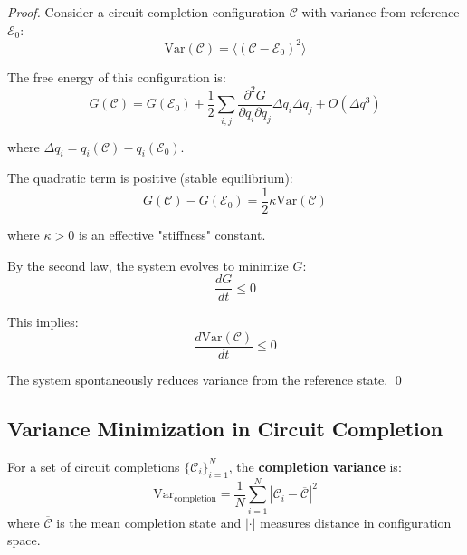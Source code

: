 \begin{proof}
Consider a circuit completion configuration $\mathcal{C}$ with variance from reference $\mathcal{E}_0$:
\begin{equation}
\text{Var}(\mathcal{C}) = \langle (\mathcal{C} - \mathcal{E}_0)^2 \rangle
\end{equation}

The free energy of this configuration is:
\begin{equation}
G(\mathcal{C}) = G(\mathcal{E}_0) + \frac{1}{2} \sum_{i,j} \frac{\partial^2 G}{\partial q_i \partial q_j} \Delta q_i \Delta q_j + O(\Delta q^3)
\end{equation}

where $\Delta q_i = q_i(\mathcal{C}) - q_i(\mathcal{E}_0)$.

The quadratic term is positive (stable equilibrium):
\begin{equation}
G(\mathcal{C}) - G(\mathcal{E}_0) = \frac{1}{2} \kappa \text{Var}(\mathcal{C})
\end{equation}

where $\kappa > 0$ is an effective "stiffness" constant.

By the second law, the system evolves to minimize $G$:
\begin{equation}
\frac{dG}{dt} \leq 0
\end{equation}

This implies:
\begin{equation}
\frac{d\text{Var}(\mathcal{C})}{dt} \leq 0
\end{equation}

The system spontaneously reduces variance from the reference state. \qed
\end{proof}

\subsection{Variance Minimization in Circuit Completion}

\begin{definition}
\label{def:completion_variance}
For a set of circuit completions $\{\mathcal{C}_i\}_{i=1}^{N}$, the \textbf{completion variance} is:
\begin{equation}
\text{Var}_{\text{completion}} = \frac{1}{N} \sum_{i=1}^{N} |\mathcal{C}_i - \overline{\mathcal{C}}|^2
\end{equation}
where $\overline{\mathcal{C}}$ is the mean completion state and $|\cdot|$ measures distance in configuration space.
\end{definition}

